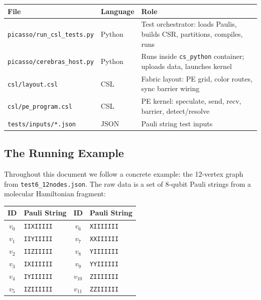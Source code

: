 \documentclass[11pt,letterpaper]{article}
\begin{document}
\begin{center}
\renewcommand{\arraystretch}{1.2}
\begin{tabular}{lll}
\toprule
\textbf{File} & \textbf{Language} & \textbf{Role} \\
\midrule
\texttt{picasso/run\_csl\_tests.py} & Python & Test orchestrator: loads Paulis, builds CSR, partitions, compiles, runs \\
\texttt{picasso/cerebras\_host.py}  & Python & Runs inside \texttt{cs\_python} container; uploads data, launches kernel \\
\texttt{csl/layout.csl}            & CSL    & Fabric layout: PE grid, color routes, sync barrier wiring \\
\texttt{csl/pe\_program.csl}       & CSL    & PE kernel: speculate, send, recv, barrier, detect/resolve \\
\texttt{tests/inputs/*.json}       & JSON   & Pauli string test inputs \\
\bottomrule
\end{tabular}
\end{center}

\subsection{The Running Example}

Throughout this document we follow a concrete example: the 12-vertex graph from \texttt{test6\_12nodes.json}. The raw data is a set of 8-qubit Pauli strings from a molecular Hamiltonian fragment:

\begin{center}
\begin{tabular}{clcl}
\toprule
\textbf{ID} & \textbf{Pauli String} & \textbf{ID} & \textbf{Pauli String} \\
\midrule
$v_0$  & \texttt{IIXIIIII} & $v_6$  & \texttt{XIIIIIII} \\
$v_1$  & \texttt{IIYIIIII} & $v_7$  & \texttt{XXIIIIII} \\
$v_2$  & \texttt{IIZIIIII} & $v_8$  & \texttt{YIIIIIII} \\
$v_3$  & \texttt{IXIIIIII} & $v_9$  & \texttt{YYIIIIII} \\
$v_4$  & \texttt{IYIIIIII} & $v_{10}$ & \texttt{ZIIIIIII} \\
$v_5$  & \texttt{IZIIIIII} & $v_{11}$ & \texttt{ZZIIIIII} \\
\bottomrule
\end{tabular}
\end{center}
\end{document}
